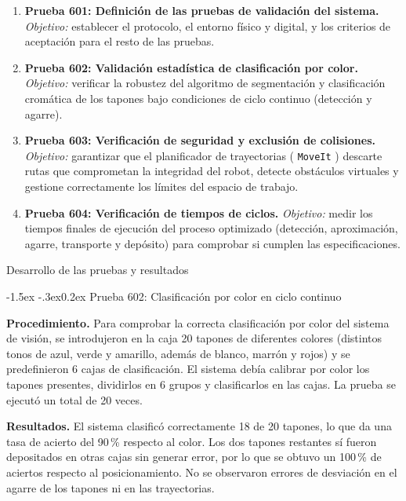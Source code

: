 \documentclass[12pt,a4paper]{article}
\makeatletter
\newcommand{\subsecfmt}[1]{%
  {\large\bfseries\color{MediumBlue}#1}%
  \par\vspace{2pt}%
}
\renewcommand\subsection{%
  \@ifstar\subsection@star\subsection@nostar
}
\newcommand\subsection@nostar[1]{%
  \refstepcounter{subsection}%
  \addcontentsline{toc}{subsection}{\protect\numberline{\thesubsection}#1}%
  \vspace{10pt}%
  \subsecfmt{\thesubsection.\enspace #1}%
  \vspace{2pt}%
}
\newcommand\subsection@star[1]{%
  \vspace{10pt}\subsecfmt{#1}\vspace{2pt}%
}
\renewcommand\subsubsection{\@startsection{subsubsection}{3}{\z@}%
  {-1.5ex \@plus -.3ex}{0.2ex}%
  {\normalsize\bfseries\color{MediumBlue}}}
\newcommand{\code}[1]{%
  \begingroup
  \def\_{\char`_\penalty0 }%
  \def\/{\char`/\penalty0 }%
  \texttt{\small #1}%
  \endgroup}
\makeatother
\begin{document}
\begin{enumerate}
  \item \textbf{Prueba 601: Definición de las pruebas de validación del sistema.}
        \textit{Objetivo:} establecer el protocolo, el entorno físico y digital, y los criterios de
        aceptación para el resto de las pruebas.
  \item \textbf{Prueba 602: Validación estadística de clasificación por color.}
        \textit{Objetivo:} verificar la robustez del algoritmo de segmentación y clasificación cromática
        de los tapones bajo condiciones de ciclo continuo (detección y agarre).
  \item \textbf{Prueba 603: Verificación de seguridad y exclusión de colisiones.}
        \textit{Objetivo:} garantizar que el planificador de trayectorias (\code{MoveIt}) descarte rutas
        que comprometan la integridad del robot, detecte obstáculos virtuales y gestione correctamente
        los límites del espacio de trabajo.
  \item \textbf{Prueba 604: Verificación de tiempos de ciclos.}
        \textit{Objetivo:} medir los tiempos finales de ejecución del proceso optimizado (detección,
        aproximación, agarre, transporte y depósito) para comprobar si cumplen las especificaciones.
\end{enumerate}

\subsection{Desarrollo de las pruebas y resultados}

\subsubsection{Prueba 602: Clasificación por color en ciclo continuo}

\textbf{Procedimiento.} Para comprobar la correcta clasificación por color del sistema de visión, se
introdujeron en la caja 20 tapones de diferentes colores (distintos tonos de azul, verde y amarillo,
además de blanco, marrón y rojos) y se predefinieron 6 cajas de clasificación. El sistema debía calibrar
por color los tapones presentes, dividirlos en 6 grupos y clasificarlos en las cajas. La prueba se
ejecutó un total de 20 veces.

\textbf{Resultados.} El sistema clasificó correctamente 18 de 20 tapones, lo que da una tasa de acierto
del 90\,\% respecto al color. Los dos tapones restantes sí fueron depositados en otras cajas sin generar
error, por lo que se obtuvo un 100\,\% de aciertos respecto al posicionamiento. No se observaron errores
de desviación en el agarre de los tapones ni en las trayectorias.
\end{document}
